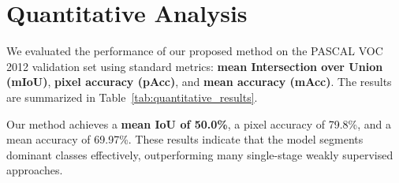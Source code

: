 
\section{Quantitative Analysis}
\label{sec:quantitative_analysis}

We evaluated the performance of our proposed method on the PASCAL VOC 2012 validation set using standard metrics: \textbf{mean Intersection over Union (mIoU)}, \textbf{pixel accuracy (pAcc)}, and \textbf{mean accuracy (mAcc)}. The results are summarized in Table~\ref{tab:quantitative_results}. 

Our method achieves a \textbf{mean IoU of 50.0\%}, a pixel accuracy of 79.8\%, and a mean accuracy of 69.97\%. These results indicate that the model segments dominant classes effectively, outperforming many single-stage weakly supervised approaches.






